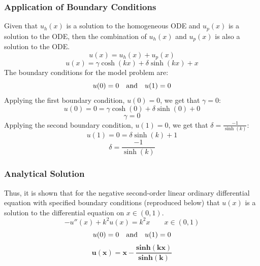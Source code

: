 \documentclass[10pt]{article}		%
\numberwithin{equation}{section}
\begin{document}
\subsubsection{Application of Boundary Conditions}

Given that $u_h(x)$ is a solution to the homogeneous ODE and $u_p(x)$ is a solution to the ODE, then the combination of $u_h(x)$ and $u_p(x)$ is also a solution to the ODE.
\begin{equation}
u(x) = u_h(x) + u_p(x)
\end{equation}
\begin{equation}
u(x) = \gamma \cosh(kx) + \delta \sinh(kx) + x
\end{equation}
The boundary conditions for the model problem are:
\begin{equation}
u(0) = 0 \quad \textnormal{and} \quad u(1) = 0 
\end{equation}
Applying the first boundary condition, $u(0) = 0$, we get that $\gamma = 0$:
\begin{equation}
u(0) = 0 = \gamma \cosh(0) + \delta \sinh(0) + 0
\end{equation}
\begin{equation}
\gamma = 0
\end{equation}
Applying the second boundary condition, $u(1) = 0$, we get that $\delta = \frac{-1}{\sinh(k)}$:
\begin{equation}
u(1) = 0 = \delta \sinh(k) + 1
\end{equation}
\begin{equation}
\delta = \frac{-1}{\sinh(k)}
\end{equation}

\subsubsection{Analytical Solution}

Thus, it is shown that for the negative second-order linear ordinary differential equation with specified boundary conditions (reproduced below) that $u(x)$ is a solution to the differential equation on $x \in (0, 1)$.
\begin{equation}
-u''(x)+k^2u(x)=k^2x \qquad x \in (0, 1)
\end{equation}
\begin{equation}
u(0) = 0 \quad \textnormal{and} \quad u(1) = 0 
\end{equation}
\begin{equation}
\mathbf{u(x) = x - \frac{sinh(kx)}{sinh(k)}}
\end{equation}
\end{document}
